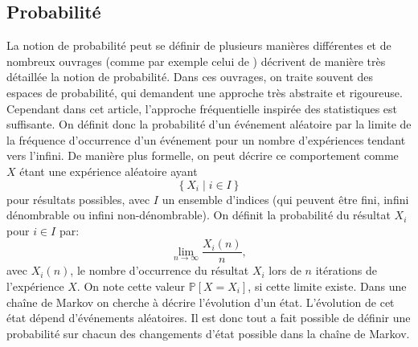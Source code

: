 \documentclass[letterpaper]{article}
\begin{document}
  \subsection{Probabilité}
    \label{probabilite}
    La notion de probabilité peut se définir de plusieurs manières différentes
    et de nombreux ouvrages (comme par exemple celui de \citet{IP}) décrivent
    de manière très détaillée la notion de probabilité.  Dans ces ouvrages, on
    traite souvent des espaces de probabilité, qui demandent une approche très
    abstraite et rigoureuse.  Cependant dans cet article, l'approche
    fréquentielle inspirée des statistiques est suffisante.
    On définit donc la probabilité d'un événement aléatoire par la limite
    de la fréquence d’occurrence d'un événement pour un nombre d'expériences
    tendant vers l'infini.  De manière plus formelle, on peut décrire ce
    comportement comme $X$ étant une expérience aléatoire ayant
    $$\left\{X_i \mid i \in I\right\}$$
    pour résultats possibles, avec $I$ un ensemble d'indices (qui peuvent
    être fini, infini dénombrable ou infini non-dénombrable).  On définit
    la probabilité du résultat $X_i$ pour $i \in I$ par:
    $$\lim_{n \to \infty}\frac {X_i(n)}n,$$
    avec $X_i(n)$, le nombre d'occurrence du résultat $X_i$ lors de
    $n$ itérations de l'expérience $X$.  On note cette valeur
    $\mathbb P[X = X_i]$, si cette limite existe.
    Dans une chaîne de Markov on cherche à décrire l'évolution d'un état.
    L'évolution de cet état dépend d'événements aléatoires.  Il est donc tout
    a fait possible de définir une probabilité sur chacun des changements
    d'état possible dans la chaîne de Markov.
\end{document}
